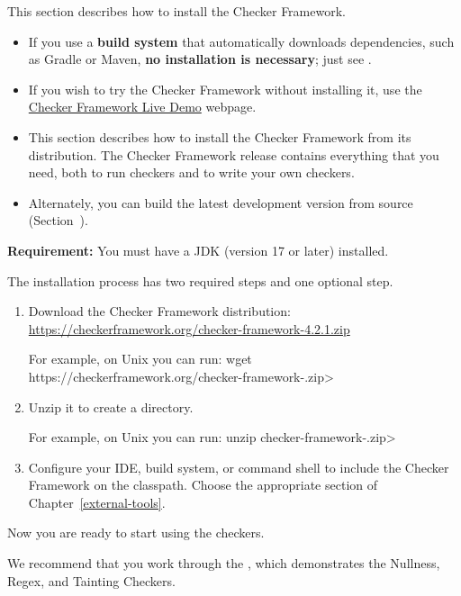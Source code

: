 
This section describes how to install the Checker Framework.
\begin{itemize}
\item
If you use a \textbf{build system} that automatically downloads dependencies,
such as Gradle or Maven, \textbf{no installation is necessary}; just see
.
\item
If you wish to try the Checker Framework without installing it, use the
\href{https://eisop.uwaterloo.ca/live/}{Checker Framework Live Demo} webpage.
\item
This section describes how to install the Checker Framework from its
distribution.  The Checker Framework release contains everything that you
need, both to run checkers and to write your own checkers.
\item
Alternately, you can build the latest development version from source
(Section~).
\end{itemize}


\textbf{Requirement:}
You must have a JDK (version 17 or later) installed.

The installation process has two required steps and one
optional step.
\begin{enumerate}
\item
  Download the Checker Framework distribution:
  \\
  \url{https://checkerframework.org/checker-framework-4.2.1.zip}

  For example, on Unix you can run: \<wget https://checkerframework.org/checker-framework-\ReleaseVersion{}.zip>

\item
  Unzip it to create a  directory.

  For example, on Unix you can run: \<unzip checker-framework-\ReleaseVersion{}.zip>

\item
  \label{installation-configure-step}%
  Configure your IDE, build system, or command shell to include the Checker
  Framework on the classpath.  Choose the appropriate section of
  Chapter~\ref{external-tools}.


\end{enumerate}

Now you are ready to start using the checkers.

We recommend that you work through the
, which demonstrates the Nullness, Regex, and Tainting Checkers.


